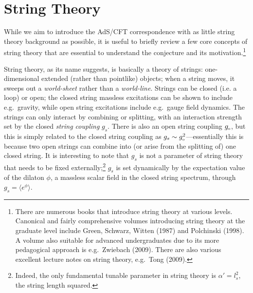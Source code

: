 \documentclass[12pt]{article}
\def\a{\alpha}
\def\a{\alpha}
\renewcommand{\^}[1]{\hat{#1}}
\newcommand{\tn}[1]{\mbox{\tiny #1}}
\begin{document}
\section{String Theory}\label{stringrecap}


While we aim to introduce the AdS/CFT correspondence with as little string theory background as possible, it is useful to briefly review a few core concepts of string theory that are essential to understand the conjecture and its motivation.\footnote{There are numerous books that introduce string theory at various levels. Canonical and fairly comprehensive volumes introducing string theory at the graduate level include Green, Schwarz, Witten (1987) and Polchinski (1998). A volume also suitable for advanced undergraduates due to its more pedagogical approach is e.g.~Zwiebach (2009). There are also various excellent lecture notes on string theory, e.g.~Tong (2009).}

String theory, as its name suggests, is basically a theory of strings: one-dimensional extended (rather than pointlike) objects; when a string moves, it sweeps out a {\it world-sheet} rather than a {\it world-line}. Strings can be closed (i.e. a loop) or open; the closed string massless excitations can be shown to include e.g.~gravity, while open string excitations include e.g.~gauge field dynamics. The strings can only interact by combining or splitting, with an interaction strength set by the closed \emph{string coupling} $g_s$. There is also an open string coupling $g_{\tn{o}}$, but this is simply related to the closed string coupling as $g_s\sim g_{\tn{o}}^2$---essentially this is because two open strings can combine into (or arise from the splitting of) one closed string. It is interesting to note that $g_s$ is not a parameter of string theory that needs to be fixed externally;\footnote{Indeed, the only fundamental tunable parameter in string theory is $\a'=l_s^2$, the string length squared.
} 
$g_s$ is set dynamically by the expectation value of the dilaton $\phi$, a massless scalar field in the closed string spectrum, through $g_s = \langle e^{\phi}\rangle$.
\end{document}
